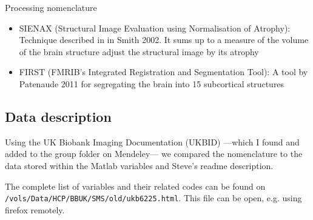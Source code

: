 \documentclass{article}
\begin{document}
Processing nomenclature
\begin{itemize}
\item SIENAX (Structural Image Evaluation using Normalisation of Atrophy): Technique described in in Smith 2002. It sums up to a measure of the volume of the brain structure adjust the structural image by its atrophy 
  \item FIRST (FMRIB's Integrated Registration and Segmentation Tool): A tool by Patenaude 2011 for segregating the brain into 15 subcortical structures
\end{itemize}

\subsection{Data description\label{data}}

Using the UK Biobank Imaging Documentation (UKBID) ---which I found and added to the group folder on Mendeley--- we compared the nomenclature to the data stored within the Matlab variables and Steve's readme description.

The complete list of variables and their related codes can be found on {\tt /vols/Data/HCP/BBUK/SMS/old/ukb6225.html}. This file can be open, e.g. using firefox remotely.
\end{document}
